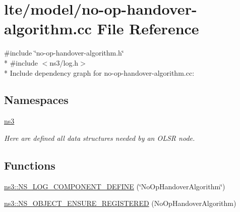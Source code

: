 \hypertarget{lte_2model_2no-op-handover-algorithm_8cc}{}\section{lte/model/no-\/op-\/handover-\/algorithm.cc File Reference}
\label{lte_2model_2no-op-handover-algorithm_8cc}
{\ttfamily \#include \char`\"{}no-\/op-\/handover-\/algorithm.\+h\char`\"{}}\\*
{\ttfamily \#include $<$ns3/log.\+h$>$}\\*
Include dependency graph for no-\/op-\/handover-\/algorithm.cc\+:
\subsection*{Namespaces}
\begin{DoxyCompactItemize}
\item 
 \hyperlink{namespacens3}{ns3}
\begin{DoxyCompactList}\small\item\em Here are defined all data structures needed by an O\+L\+SR node. \end{DoxyCompactList}\end{DoxyCompactItemize}
\subsection*{Functions}
\begin{DoxyCompactItemize}
\item 
\hyperlink{namespacens3_a6ffcef963a2374e79b41ecb9d46d1fdc}{ns3\+::\+N\+S\+\_\+\+L\+O\+G\+\_\+\+C\+O\+M\+P\+O\+N\+E\+N\+T\+\_\+\+D\+E\+F\+I\+NE} (\char`\"{}No\+Op\+Handover\+Algorithm\char`\"{})
\item 
\hyperlink{namespacens3_a941b18f35e40de73bbd6e33d24e19933}{ns3\+::\+N\+S\+\_\+\+O\+B\+J\+E\+C\+T\+\_\+\+E\+N\+S\+U\+R\+E\+\_\+\+R\+E\+G\+I\+S\+T\+E\+R\+ED} (No\+Op\+Handover\+Algorithm)
\end{DoxyCompactItemize}
